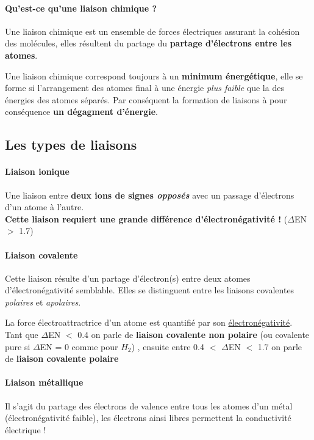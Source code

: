 \documentclass[10pt,a4paper]{book}
\begin{document}
\paragraph{Qu'est-ce qu'une liaison chimique ?} Une liaison chimique est un ensemble de forces électriques assurant la cohésion des molécules, elles résultent du partage du \textbf{partage d'électrons entre les atomes}. \par
Une liaison chimique correspond toujours à un \textbf{minimum énergétique}, elle se forme si l'arrangement des atomes final à une énergie \textit{plus faible} que la des énergies des atomes séparés. Par conséquent la formation de liaisons à pour conséquence \textbf{un dégagment d'énergie}.

\subsection{Les types de liaisons}

\paragraph{Liaison ionique} Une liaison entre \textbf{deux ions de signes \textit{opposés}} avec un passage d'électrons d'un atome à l'autre.\\ %
\textbf{Cette liaison requiert une grande différence d'électronégativité !} ($\Delta$EN $>$ 1.7)
\paragraph{Liaison covalente} Cette liaison résulte d'un partage d'électron(s) entre deux atomes d'électronégativité semblable. Elles se distinguent entre les liaisons covalentes \textit{polaires} et \textit{apolaires}. \par
La force électroattractrice d'un atome est quantifié par son \hyperlink{electronegativity}{électronégativité}. Tant que $\Delta$EN $<$ 0.4 on parle de \textbf{liaison covalente non polaire} (ou covalente pure si $\Delta$EN = 0 comme pour $H_2$) , ensuite  entre 0.4 $<$ $\Delta$EN $<$ 1.7 on parle de \textbf{liaison covalente polaire} 
\paragraph{Liaison métallique} Il s'agit du partage des électrons de valence entre tous les atomes d'un métal (électronégativité faible), les électrons ainsi libres permettent la conductivité électrique !
\newpage
\end{document}
